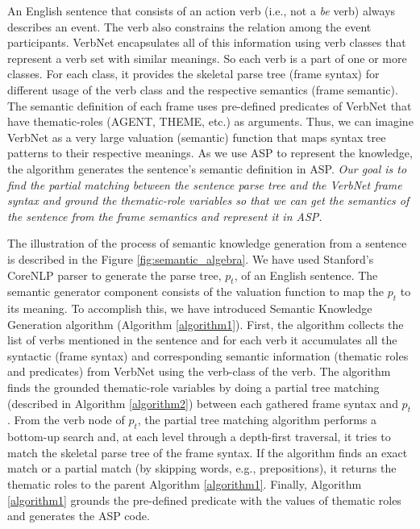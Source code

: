 \documentclass[letterpaper]{article}
\begin{document}
An English sentence that consists of an action verb (i.e., not a \textit{be} verb) always describes an event. The verb also constrains the relation among the event participants. VerbNet encapsulates all of this information using verb classes that represent a verb set with similar meanings. So each verb is a part of one or more classes. For each class, it provides the skeletal parse tree (frame syntax) for different usage of the verb class and the respective semantics (frame semantic). The semantic definition of each frame uses pre-defined predicates of VerbNet that have thematic-roles (AGENT, THEME, etc.) as arguments. Thus, we can imagine VerbNet as a very large valuation (semantic) function that maps syntax tree patterns to their respective meanings. As we use ASP to represent the knowledge, the algorithm generates the sentence's semantic definition in ASP. \textit{Our goal is to find the partial matching between the sentence parse tree and the VerbNet frame syntax and ground the thematic-role variables so that we can get the semantics of the sentence from the frame semantics and represent it in ASP.}

The illustration of the process of semantic knowledge generation from a sentence is described in the Figure \ref{fig:semantic_algebra}. We have used Stanford's CoreNLP parser \cite{corenlp} to generate the parse tree, $p_t$, of an English sentence. The semantic generator component consists of the valuation function to map the $p_t$ to its meaning. To accomplish this, we have introduced Semantic Knowledge Generation algorithm (Algorithm \ref{algorithm1}). First, the algorithm collects the list of verbs mentioned in the sentence and for each verb it accumulates all the syntactic (frame syntax) and corresponding semantic information (thematic roles and predicates)  from VerbNet using the verb-class of the verb. The algorithm finds the grounded thematic-role variables by doing a partial tree matching (described in Algorithm \ref{algorithm2}) between each gathered frame syntax and $p_t$. From the verb node of $p_t$, the partial tree matching algorithm performs a bottom-up search and, at each level through a depth-first traversal, it tries to match the skeletal parse tree of the frame syntax. If the algorithm finds an exact match or a partial match (by skipping words, e.g., prepositions), it returns the thematic roles to the parent Algorithm \ref{algorithm1}. Finally, Algorithm \ref{algorithm1} grounds the pre-defined predicate with the values of thematic roles and generates the ASP code.
\end{document}
